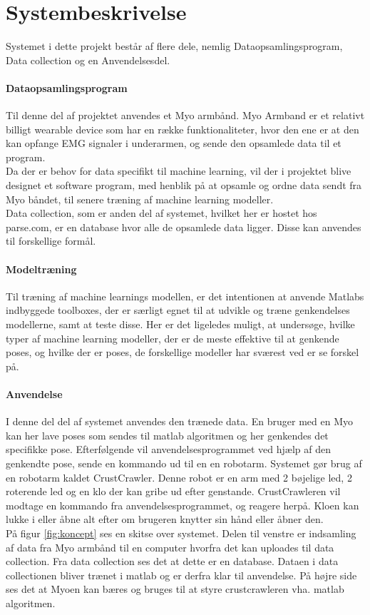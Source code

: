 \thispagestyle{fancy}
\chapter{Systembeskrivelse}
\label{chp:systembeskrivelse}

Systemet i dette projekt består af flere dele, nemlig Dataopsamlingsprogram, Data collection og en Anvendelsesdel.
\subsubsection{Dataopsamlingsprogram}
Til denne del af projektet anvendes et Myo armbånd. Myo Armband er et relativt billigt wearable device som har en række funktionaliteter, hvor den ene er at den kan opfange EMG signaler i underarmen, og sende den opsamlede data til et program.\\
Da der er behov for data specifikt til machine learning, vil der i projektet blive designet et software program, med henblik på at opsamle og ordne data sendt fra Myo båndet, til senere træning af machine learning modeller.\\
Data collection, som er anden del af systemet, hvilket her er hostet hos parse.com, er en database hvor alle de opsamlede data ligger. Disse kan anvendes til forskellige formål.

\subsubsection{Modeltræning}
Til træning af machine learnings modellen, er det intentionen at anvende Matlabs indbyggede toolboxes, der er særligt egnet til at udvikle og træne genkendelses modellerne, samt at teste disse. 
Her er det ligeledes muligt, at undersøge, hvilke typer af machine learning modeller, der er de meste effektive til at genkende poses, og hvilke der er poses, de forskellige modeller har sværest ved er se forskel på.

\subsubsection{Anvendelse}
I denne del del af systemet anvendes den trænede data. En bruger med en Myo kan her lave poses som sendes til matlab algoritmen og her genkendes det specifikke pose. Efterfølgende vil anvendelsesprogrammet ved hjælp af den genkendte pose, sende en kommando ud til en en robotarm. Systemet gør brug af en robotarm kaldet CrustCrawler. Denne robot er en arm med 2 bøjelige led, 2 roterende led og en klo der kan gribe ud efter genstande. CrustCrawleren vil modtage en kommando fra anvendelsesprogrammet, og reagere herpå. Kloen kan lukke i eller åbne alt efter om brugeren knytter sin hånd eller åbner den.\\


På figur \ref{fig:koncept} ses en skitse over systemet. Delen til venstre er indsamling af data fra Myo armbånd til en computer hvorfra det kan uploades til data collection. Fra data collection ses det at dette er en database. Dataen i data collectionen bliver trænet i matlab og er derfra klar til anvendelse. På højre side ses det at Myoen kan bæres og bruges til at styre crustcrawleren vha. matlab algoritmen.

